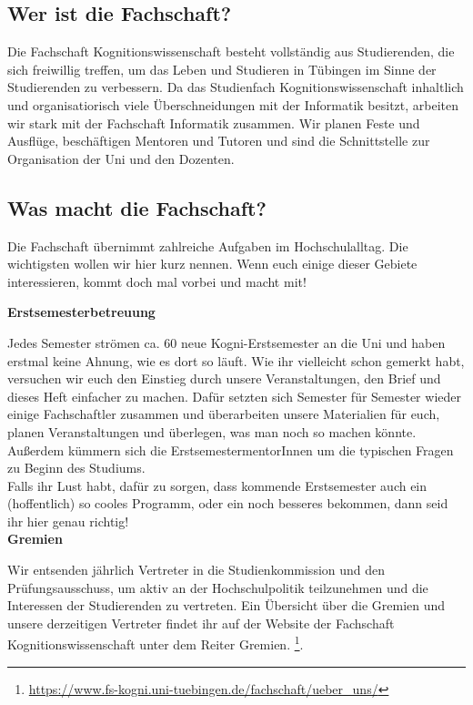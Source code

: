 \subsection{Wer ist die Fachschaft?}
Die Fachschaft Kognitionswissenschaft besteht vollständig aus Studierenden, die sich freiwillig treffen, um das Leben und Studieren in Tübingen im Sinne der Studierenden zu verbessern. Da das Studienfach Kognitionswissenschaft inhaltlich und organisatiorisch viele Überschneidungen mit der Informatik besitzt, arbeiten wir stark mit der Fachschaft Informatik zusammen.
Wir planen Feste und Ausflüge, beschäftigen Mentoren und Tutoren und sind die Schnittstelle zur Organisation der Uni und den Dozenten.

\subsection{Was macht die Fachschaft?}
Die Fachschaft übernimmt zahlreiche Aufgaben im Hochschulalltag. Die wichtigsten wollen wir hier kurz nennen. Wenn euch einige dieser Gebiete interessieren, kommt doch mal vorbei und macht mit!

\textbf{Erstsemesterbetreuung}

Jedes Semester strömen ca. 60 neue Kogni-Erstsemester an die Uni und haben erstmal keine Ahnung, wie es dort so läuft. Wie ihr vielleicht schon gemerkt habt, versuchen wir euch den Einstieg durch unsere Veranstaltungen, den Brief und dieses Heft einfacher zu machen. Dafür setzten sich Semester für Semester wieder einige Fachschaftler zusammen und überarbeiten unsere Materialien für euch, planen Veranstaltungen und überlegen, was man noch so machen könnte. Außerdem kümmern sich die ErstsemestermentorInnen um die typischen Fragen zu Beginn des Studiums.\\
Falls ihr Lust habt, dafür zu sorgen, dass kommende Erstsemester auch ein (hoffentlich) so cooles Programm, oder ein noch besseres bekommen, dann seid ihr hier genau richtig!\\

\textbf{Gremien}

Wir entsenden jährlich Vertreter in die Studienkommission und den Prüfungsausschuss, um aktiv an der Hochschulpolitik teilzunehmen und die Interessen der Studierenden zu vertreten. Ein Übersicht über die Gremien und unsere derzeitigen Vertreter findet ihr auf der Website der Fachschaft Kognitionswissenschaft unter dem Reiter Gremien. \footnote{\url{https://www.fs-kogni.uni-tuebingen.de/fachschaft/ueber_uns/}}. \\

